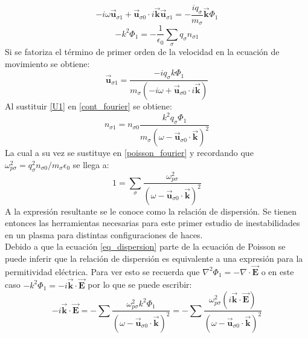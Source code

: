 \documentclass[12pt]{article}
\begin{document}
\begin{equation}
\label{eq_mov_fourier}
-i \omega \overrightarrow{\textbf{u}}_{\sigma 1} + \overrightarrow{\textbf{u}}_{\sigma 0} \cdot i \overrightarrow{\textbf{k}}\overrightarrow{\textbf{u}}_{\sigma 1} = - \frac{i q_{\sigma}}{m_{\sigma}} \overrightarrow{\textbf{k}}\Phi _1
\end{equation}
\begin{equation}
\label{poisson_fourier}
-k^2 \Phi _1 = -\frac{1}{\epsilon_0}\sum _{\sigma}q_{\sigma} n_{\sigma 1}
\end{equation}
Si se fatoriza el término de primer orden de la velocidad en la ecuación de movimiento se obtiene:
\begin{equation}
\label{U1}
\overrightarrow{\textbf{u}}_{\sigma 1} = \frac{- i q_{\sigma} k \Phi _1}{m_{\sigma}(-i \omega + \overrightarrow{\textbf{u}}_{\sigma 0} \cdot i \overrightarrow{\textbf{k}})}
\end{equation}
Al sustituir \ref{U1} en \ref{cont_fourier} se obtiene:
\begin{equation}
n_{\sigma 1} = n_{\sigma 0}\frac{k^2 q_{\sigma} \Phi _1  }{m_{\sigma}(\omega - \overrightarrow{\textbf{u}}_{\sigma 0} \cdot \overrightarrow{\textbf{k}})^2 }
\end{equation}
La cual a su vez se sustituye en \ref{poisson_fourier} y recordando que $\omega_{p \sigma}^2 = q_{\sigma}^2 n_{\sigma 0} / m_{\sigma} \epsilon_0$ se llega a:
\begin{equation}
\label{eq_dispersion}
1 = \sum_{\sigma} \frac{\omega_{p \sigma}^2}{(\omega - \overrightarrow{\textbf{u}}_{\sigma 0} \cdot \overrightarrow{\textbf{k}})^2}
\end{equation}
A la expresión resultante se le conoce como la relación de dispersión. Se tienen entonces las herramientas necesarias para este primer estudio de inestabilidades en un plasma para distintas configuraciones de haces.\\
Debido a que la ecuación \ref{eq_dispersion} parte de la ecuación de Poisson se puede inferir que la relación de dispersión es equivalente a una expresión para la permitividad eléctrica. Para ver esto se recuerda que
$\nabla ^2 \Phi _1 = - \nabla \cdot \overrightarrow{\textbf{E}}$ o en este caso $-k^2 \Phi _1 = -i \overrightarrow{\textbf{k}} \cdot \overrightarrow{\textbf{E}}$ por lo que se puede escribir:
\begin{equation}
-i \overrightarrow{\textbf{k}} \cdot \overrightarrow{\textbf{E}} = - \sum \frac{\omega_{p \sigma}^2 k^2 \Phi _1}{(\omega - \overrightarrow{\textbf{u}}_{\sigma 0} \cdot \overrightarrow{\textbf{k}})^2} = - \sum \frac{\omega_{p \sigma}^2 (i \overrightarrow{\textbf{k}} \cdot \overrightarrow{\textbf{E}})}{(\omega - \overrightarrow{\textbf{u}}_{\sigma 0} \cdot \overrightarrow{\textbf{k}})^2}
\end{equation}
\end{document}
